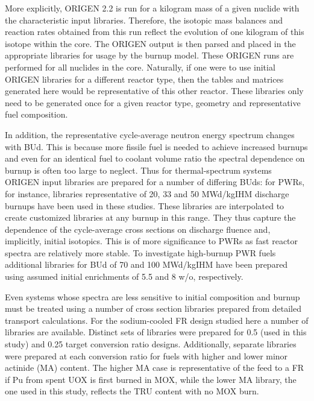 More explicitly, ORIGEN 2.2 is run for a kilogram mass of a given nuclide with the characteristic 
input libraries.  Therefore, the isotopic mass balances and reaction rates obtained from this run 
reflect the evolution of one kilogram of this isotope within the core.  The ORIGEN output is then 
parsed and placed in the appropriate libraries for usage by the burnup model.  These ORIGEN runs are 
performed for all nuclides in the core.  Naturally, if one were to use initial ORIGEN libraries for a 
different reactor type, then the tables and matrices generated here would be representative of this 
other reactor.  These libraries only need to be generated once for a given reactor type, geometry 
and representative fuel composition.

In addition, the representative cycle-average neutron energy spectrum changes with BUd.  This is because 
more fissile fuel is needed to achieve increased burnups and even for an identical fuel to coolant volume 
ratio the spectral dependence on burnup is often too large to neglect.  Thus for thermal-spectrum systems 
ORIGEN input libraries are prepared for a number of differing BUds: for PWRs, for instance, libraries 
representative of 20, 33 and 50 MWd/kgIHM discharge burnups have been used in these studies.  These 
libraries are interpolated to create customized libraries at any burnup in this range.  They thus 
capture the dependence of the cycle-average cross sections on discharge fluence and, implicitly, 
initial isotopics.  This is of more significance to PWRs as fast reactor spectra are relatively more 
stable. To investigate high-burnup PWR fuels additional libraries for BUd of 70 and 100 MWd/kgIHM 
have been prepared using assumed initial  enrichments of 5.5 and 8 w/o, respectively.

Even systems whose spectra are less sensitive to initial composition and burnup must be treated using a 
number of cross section libraries prepared from detailed transport calculations.  For the sodium-cooled 
FR design studied here a number of libraries are available.  
Distinct sets of libraries were prepared for 0.5 (used in this study) and 0.25 target 
conversion ratio designs.  Additionally, separate libraries were prepared at each conversion ratio for 
fuels with higher and lower minor actinide (MA) content.   The higher MA case is representative of the 
feed to a FR if Pu from spent UOX is first burned in MOX, while the lower MA library, the one used in 
this study, reflects the TRU content with no MOX burn.




